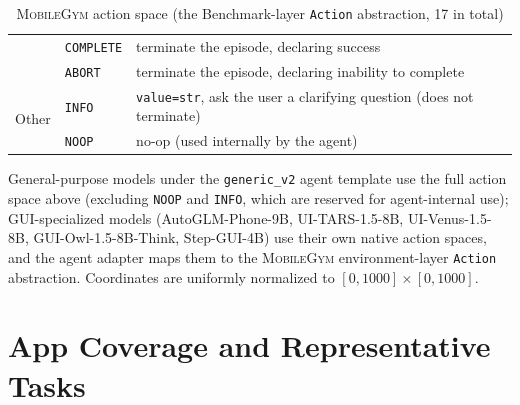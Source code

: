 \documentclass{llmxive}
\providecommand{\sys}{\textsc{MobileGym}}
\begin{document}
\begin{table}[!htbp]
{\begin{tabular}{llp{4.4cm}}
      & \texttt{COMPLETE} & terminate the episode, declaring success \\
      & \texttt{ABORT}    & terminate the episode, declaring inability to complete \\
    \midrule
    \multirow{2}{*}{Other}
      & \texttt{INFO}     & \texttt{value=str}, ask the user a clarifying question (does not terminate) \\
      & \texttt{NOOP}     & no-op (used internally by the agent) \\
    \bottomrule
  \end{tabular}%
  }
  \caption{\sys{} action space (the Benchmark-layer \texttt{Action} abstraction, 17 in total)}
  \label{tab:action-space}
\end{table}

General-purpose models under the \texttt{generic\_v2} agent template use the full action space above (excluding \texttt{NOOP} and \texttt{INFO}, which are reserved for agent-internal use); GUI-specialized models (AutoGLM-Phone-9B, UI-TARS-1.5-8B, UI-Venus-1.5-8B, GUI-Owl-1.5-8B-Think, Step-GUI-4B) use their own native action spaces, and the agent adapter maps them to the \sys{} environment-layer \texttt{Action} abstraction. Coordinates are uniformly normalized to $[0,1000] \times [0,1000]$.


\section{App Coverage and Representative Tasks}\label{app:apps}
\end{document}

